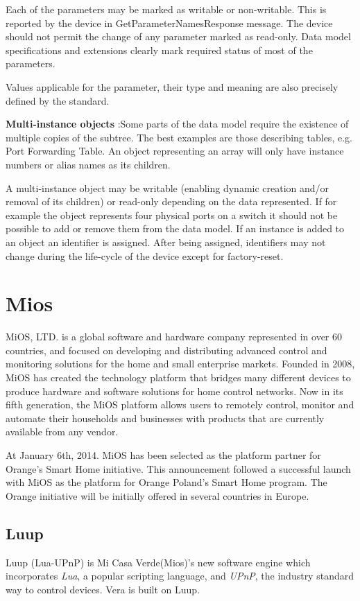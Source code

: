 Each of the parameters may be marked as writable or non-writable. This is reported by the device in GetParameterNamesResponse message. The device should not permit the change of any parameter marked as read-only. Data model specifications and extensions clearly mark required status of most of the parameters.

Values applicable for the parameter, their type and meaning are also precisely defined by the standard.

\textbf{Multi-instance objects} :Some parts of the data model require the existence of multiple copies of the subtree. The best examples are those describing tables, e.g. Port Forwarding Table. An object representing an array will only have instance numbers or alias names as its children.

A multi-instance object may be writable (enabling dynamic creation and/or removal of its children) or read-only depending on the data represented. If for example the object represents four physical ports on a switch it should not be possible to add or remove them from the data model. If an instance is added to an object an identifier is assigned. After being assigned, identifiers may not change during the life-cycle of the device except for factory-reset.
\section{Mios}
MiOS, LTD. is a global software and hardware company represented in over 60 countries, and focused on developing and distributing advanced control and monitoring solutions for the home and small enterprise markets. Founded in 2008, MiOS has created the technology platform that bridges many different devices to produce hardware and software solutions for home control networks. Now in its fifth generation, the MiOS platform allows users to remotely control, monitor and automate their households and businesses with products that are currently available from any vendor.

At January 6th, 2014. MiOS has been selected as the platform partner for Orange’s Smart Home initiative. This announcement followed a successful launch with MiOS as the platform for Orange Poland’s Smart Home program.  The Orange initiative will be initially offered in several countries in Europe.

\subsection{Luup}
Luup (Lua-UPnP) is Mi Casa Verde(Mios)’s new software engine which incorporates \textit{Lua}, a popular scripting language, and \textit{UPnP}, the industry standard way to control devices. Vera is built on Luup.

